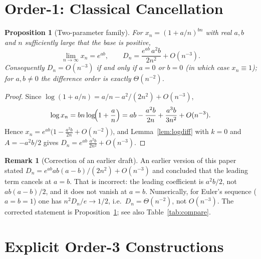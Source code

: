 \documentclass[11pt]{article}
\newtheorem{proposition}[theorem]{Proposition}
\theoremstyle{definition}
\newtheorem{remark}[theorem]{Remark}
\begin{document}
\section{Order-1: Classical Cancellation}
\begin{proposition}[Two-parameter family]\label{prop:order1}
For $x_n = (1+a/n)^{bn}$ with real $a,b$ and $n$ sufficiently large that the base
is positive,
\[
  \lim_{n\to\infty} x_n = e^{ab},
  \qquad
  D_n = \frac{e^{ab}\,a^2 b}{2n^2} + O(n^{-3}).
\]
Consequently $D_n = O(n^{-3})$ if and only if $a=0$ or $b=0$ (in which case
$x_n\equiv1$); for $a,b\neq0$ the difference order is exactly $\Theta(n^{-2})$.
\end{proposition}

\begin{proof}
Since $\log(1+a/n) = a/n - a^2/(2n^2) + O(n^{-3})$,
\[
  \log x_n = bn\log\!\Bigl(1+\frac{a}{n}\Bigr)
           = ab - \frac{a^2 b}{2n} + \frac{a^3 b}{3n^2} + O(n^{-3}).
\]
Hence $x_n = e^{ab}\bigl(1 - \tfrac{a^2 b}{2n} + O(n^{-2})\bigr)$, and
Lemma~\ref{lem:logdiff} with $k=0$ and $A=-a^2b/2$ gives
$D_n = e^{ab}\,\tfrac{a^2 b}{2n^2} + O(n^{-3})$.
\end{proof}

\begin{remark}[Correction of an earlier draft]\label{rem:correction}
An earlier version of this paper stated
$D_n = e^{ab}ab(a-b)/(2n^2)+O(n^{-3})$ and concluded that the leading term
cancels at $a=b$. That is incorrect: the leading coefficient is $a^2b/2$, not
$ab(a-b)/2$, and it does not vanish at $a=b$. Numerically, for Euler's sequence
($a=b=1$) one has $n^2 D_n/e \to 1/2$, i.e.\ $D_n=\Theta(n^{-2})$, not
$O(n^{-3})$. The corrected statement is Proposition~\ref{prop:order1}; see also
Table~\ref{tab:compare}.
\end{remark}

\section{Explicit Order-3 Constructions}\label{sec:order3}
\end{document}
